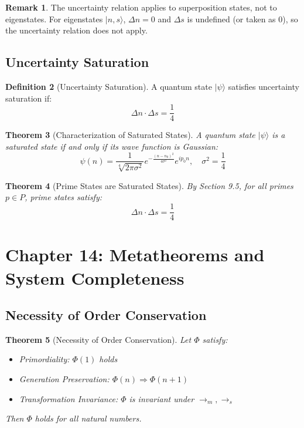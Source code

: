 \documentclass[12pt]{article}
\newtheorem{theorem}{Theorem}[section]
\theoremstyle{definition}
\newtheorem{definition}[theorem]{Definition}
\newtheorem{remark}[theorem]{Remark}
\begin{document}
\begin{remark}
The uncertainty relation applies to superposition states, not to eigenstates. For eigenstates \(|n,s\rangle\), \(\Delta n = 0\) and \(\Delta s\) is undefined (or taken as 0), so the uncertainty relation does not apply.
\end{remark}

\subsection{Uncertainty Saturation}

\begin{definition}[Uncertainty Saturation]
A quantum state \(|\psi\rangle\) satisfies uncertainty saturation if:
\[
\Delta n \cdot \Delta s = \frac{1}{4}
\]
\end{definition}

\begin{theorem}[Characterization of Saturated States]
A quantum state \(|\psi\rangle\) is a saturated state if and only if its wave function is Gaussian:
\[
\psi(n) = \frac{1}{\sqrt[4]{2\pi\sigma^2}} e^{-\frac{(n-n_0)^2}{4\sigma^2}} e^{ip_0 n},\quad \sigma^2 = \frac{1}{4}
\]
\end{theorem}

\begin{theorem}[Prime States are Saturated States]
By Section 9.5, for all primes \(p \in P\), prime states satisfy:
\[
\Delta n \cdot \Delta s = \frac{1}{4}
\]
\end{theorem}

\section{Chapter 14: Metatheorems and System Completeness}

\subsection{Necessity of Order Conservation}

\begin{theorem}[Necessity of Order Conservation]
Let \(\Phi\) satisfy:
\begin{itemize}
    \item Primordiality: \(\Phi(1)\) holds
    \item Generation Preservation: \(\Phi(n) \Rightarrow \Phi(n+1)\)
    \item Transformation Invariance: \(\Phi\) is invariant under \(\rightarrow_m, \rightarrow_s\)
\end{itemize}
Then \(\Phi\) holds for all natural numbers.
\end{theorem}
\end{document}
